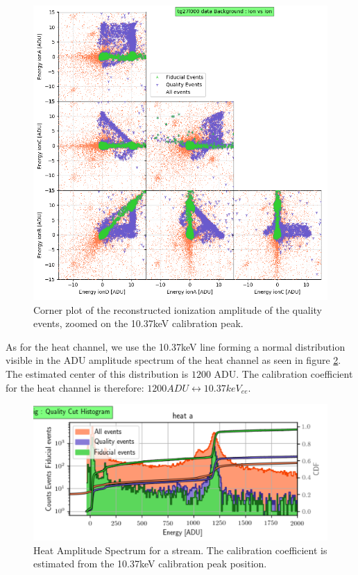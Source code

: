 \begin{figure}
\centering
\includegraphics[width=\linewidth,]{Figures/Neutron/calibration_ion.png}
\caption{Corner plot of the reconstructed ionization amplitude of the quality events, zoomed on the 10.37keV calibration peak.}
\label{fig:calibration-ion}
\end{figure}

As for the heat channel, we use the 10.37keV line forming a normal distribution visible in the ADU amplitude spectrum of the heat channel as seen in figure \ref{fig:calibration-heat}. The estimated center of this distribution is $1200$ ADU. The calibration coefficient for the heat channel is therefore: $1200 ADU \leftrightarrow 10.37 keV_{ee}$.

\begin{figure}
\centering
\includegraphics[width=\linewidth,]{Figures/Neutron/calibration_heat.png}
\caption{Heat Amplitude Spectrum for a stream. The calibration coefficient is estimated from the 10.37keV calibration peak position.}
\label{fig:calibration-heat}
\end{figure}

